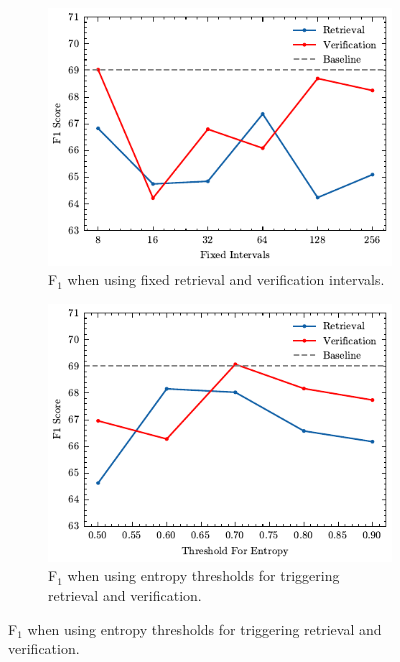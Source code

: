 \begin{figure}[t!]
\centering
\begin{subfigure}[t]{0.32\textwidth}
        \centering
        \includegraphics[width=\textwidth]{figures/fixed_interval.pdf}
        \caption{\vs F$_1$ when using fixed retrieval and verification intervals.}
        \label{fig:interval-fixed}

    \end{subfigure}%
    \hfill
    \begin{subfigure}[t]{0.32\textwidth}
        \centering
            \includegraphics[width=\textwidth]{figures/entropy_threshold.pdf}
        \caption{F$_1$ when using entropy thresholds for triggering retrieval and verification.}
                \label{fig:interval-entropy}


\end{subfigure}
\end{figure}
